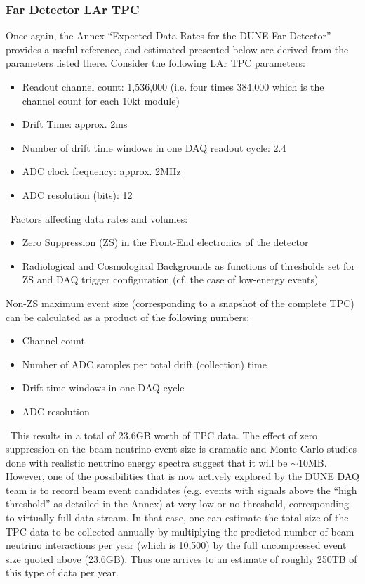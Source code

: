 \subsubsection{Far Detector LAr TPC}
Once again, the Annex ``Expected Data Rates for the DUNE Far Detector''
provides a useful reference, and estimated presented below are derived from
the parameters listed there. Consider the following LAr TPC parameters:
\begin{itemize}
\item Readout channel count: 1,536,000 (i.e. four times 384,000 which is the channel count for each 10kt module)
\item Drift Time: approx. 2ms
\item Number of drift time windows in one DAQ readout cycle: 2.4
\item ADC clock frequency: approx. 2MHz
\item ADC resolution (bits): 12
\end{itemize}
\
Factors affecting data rates and volumes:
\begin{itemize}
\item Zero Suppression (ZS)  in the Front-End electronics of the detector
\item Radiological and Cosmological Backgrounds as functions of thresholds set for ZS
and DAQ trigger configuration (cf. the case of low-energy events)
\end{itemize}

Non-ZS maximum event size (corresponding to a snapshot of the complete TPC) can be calculated as a product of the following numbers:
\begin{itemize}
\item Channel count
\item Number of ADC samples per total drift (collection) time
\item Drift time windows in one DAQ cycle
\item ADC resolution
\end{itemize}
\
This results in a total of 23.6GB worth of TPC data. The effect of zero suppression on
the beam neutrino event size is dramatic and Monte Carlo studies done with realistic neutrino
energy spectra suggest that it will be $\sim$10MB. However, one of the possibilities that is
now actively explored by the DUNE DAQ team is to record beam event candidates (e.g. events with signals
above the ``high threshold'' as detailed in the Annex) at very low or no threshold, corresponding
to virtually full data stream. In that case, one can estimate the total size of the TPC data
to be collected annually by multiplying the predicted number of beam neutrino interactions
per year (which is 10,500) by the full uncompressed event size quoted above (23.6GB). Thus one
arrives to an estimate of roughly 250TB of this type of data per year.

